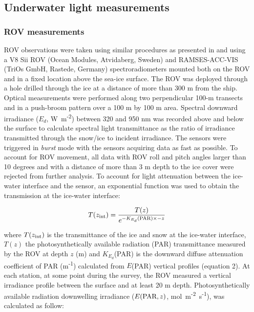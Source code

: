 \documentclass[draft]{agujournal2018}
\newcommand{\ed}{\ensuremath{{E_d}}}
\newcommand{\kdpar}{\ensuremath{K_{E_d}}(\textnormal{PAR})}
\newcommand{\epar}{\ensuremath{E}(\textnormal{PAR})}
\newcommand{\eparz}{\ensuremath{E(\textnormal{PAR}, z)}}
\newcommand{\wmsquare}{W~m\textsuperscript{-2}}
\newcommand{\micromol}{\textmu mol~m\textsuperscript{-2}~s\textsuperscript{-1}}
\begin{document}
\subsection{Underwater light measurements}

\subsubsection{ROV measurements}

ROV observations were taken using similar procedures as presented in \citet{Nicolaus2013} and \citet{Katlein2017} using a V8 Sii ROV (Ocean Modules, Atvidaberg, Sweden) and RAMSES-ACC-VIS (TriOs GmbH, Rastede, Germany) spectroradiometers mounted both on the ROV and in a fixed location above the sea-ice surface. The ROV was deployed through a hole drilled through the ice at a distance of more than 300 m from the ship. Optical measurements were performed along two perpendicular 100-m transects and in a push-broom pattern over a 100 m by 100 m area. Spectral downward irradiance (\ed{}, \wmsquare) between 320 and 950 nm was recorded above and below the surface to calculate spectral light transmittance as the ratio of irradiance transmitted through the snow/ice to incident irradiance. The sensors were triggered in \textit{burst} mode with the sensors acquiring data as fast as possible. To account for ROV movement, all data with ROV roll and pitch angles larger than 10 degrees and with a distance of more than 3 m depth to the ice cover were rejected from further analysis. To account for light attenuation between the ice-water interface and the sensor, an exponential function was used to obtain the transmission at the ice-water interface:

\begin{linenomath*}
	\begin{equation}
		T(z_\textnormal{int}) = \frac{T(z)}{e^{-\kdpar{} \times -z}}
	\end{equation}
\end{linenomath*}

\noindent where $T(z_\textnormal{int})$ is the transmittance of the ice and snow at the ice-water interface, $T(z)$ the photosynthetically available radiation (PAR) transmittance measured by the ROV at depth $z$ (m) and \kdpar{} is the downward diffuse attenuation coefficient of PAR (m\textsuperscript{-1}) calculated from \epar{} vertical profiles (equation 2). At each station, at some point during the survey, the ROV measured a vertical irradiance profile between the surface and at least 20 m depth. Photosynthetically available radiation downwelling irradiance (\eparz{}, \micromol{}), was calculated as follow:
\end{document}

